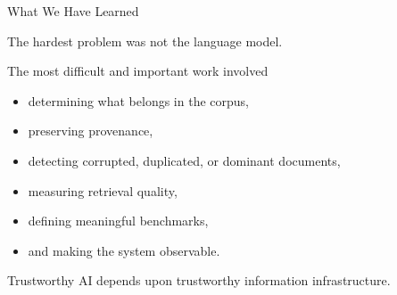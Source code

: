\documentclass[aspectratio=169]{beamer}
\begin{document}
\begin{frame}{What We Have Learned}

\small

\begin{block}{The hardest problem was not the language model.}

The most difficult and important work involved

\begin{itemize}
\setlength{\itemsep}{0.15cm}

\item determining what belongs in the corpus,

\item preserving provenance,

\item detecting corrupted, duplicated, or dominant documents,

\item measuring retrieval quality,

\item defining meaningful benchmarks,

\item and making the system observable.

\end{itemize}

\end{block}

\vspace{0.25cm}

\begin{center}
\large
Trustworthy AI depends upon trustworthy information infrastructure.
\end{center}

\end{frame}
\end{document}
